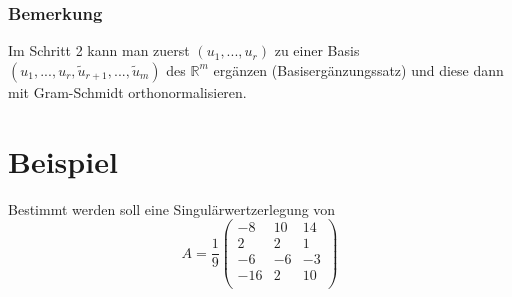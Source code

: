 \documentclass{scrbook}
\begin{document}
\subsubsection*{Bemerkung}
Im Schritt 2 kann man zuerst $(u_1,...,u_r)$ zu einer Basis $(u_1,...,u_r, \tilde{u}_{r+1},...,\tilde{u}_m)$ des $\mathbb{R}^m$ ergänzen (Basisergänzungssatz) und diese dann mit Gram-Schmidt orthonormalisieren.
\section{Beispiel}
Bestimmt werden soll eine Singulärwertzerlegung von
\[A = \frac{1}{9}\left(
\begin{array}{ccc}
-8&10&14\\
2&2&1\\
-6&-6&-3\\
-16&2&10\\
\end{array}
\right)\]
\end{document}
